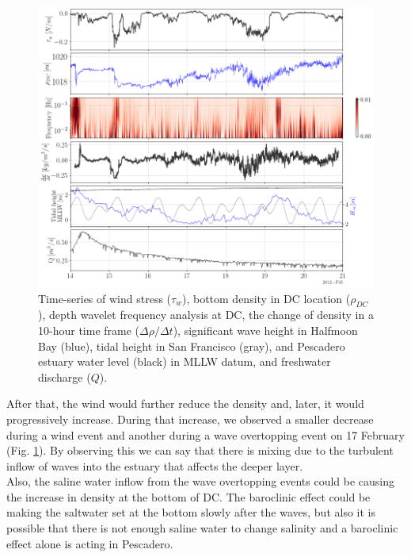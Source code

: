 \documentclass[tesis.tex]{subfiles}
\begin{document}
\begin{figure}[h!]
    \centering
    \includegraphics[width=\textwidth]{Imagenes/mix_wo.png}
    \caption{Time-series of wind stress ($\tau_w$), bottom density in DC location ($\rho_{DC}$), depth wavelet frequency analysis at DC, the change of density in a 10-hour time frame ($\Delta \rho / \Delta t$), significant wave height in Halfmoon Bay (blue), tidal height in San Francisco (gray), and Pescadero estuary water level (black) in MLLW datum, and freshwater discharge ($Q$). }
    \label{fig:mix_wo}
\end{figure}

After that, the wind would further reduce the density and, later, it would progressively increase. During that increase, we observed a smaller decrease during a wind event and another during a wave overtopping event on 17 February (Fig. \ref{fig:mix_wo}). By observing this we can say that there is mixing due to the turbulent inflow of waves into the estuary that affects the deeper layer.\\ 

Also, the saline water inflow from the wave overtopping events could be causing the increase in density at the bottom of DC. The baroclinic effect could be making the saltwater set at the bottom slowly after the waves, but also it is possible that there is not enough saline water to change salinity and a baroclinic effect alone is acting in Pescadero.\\
\end{document}
